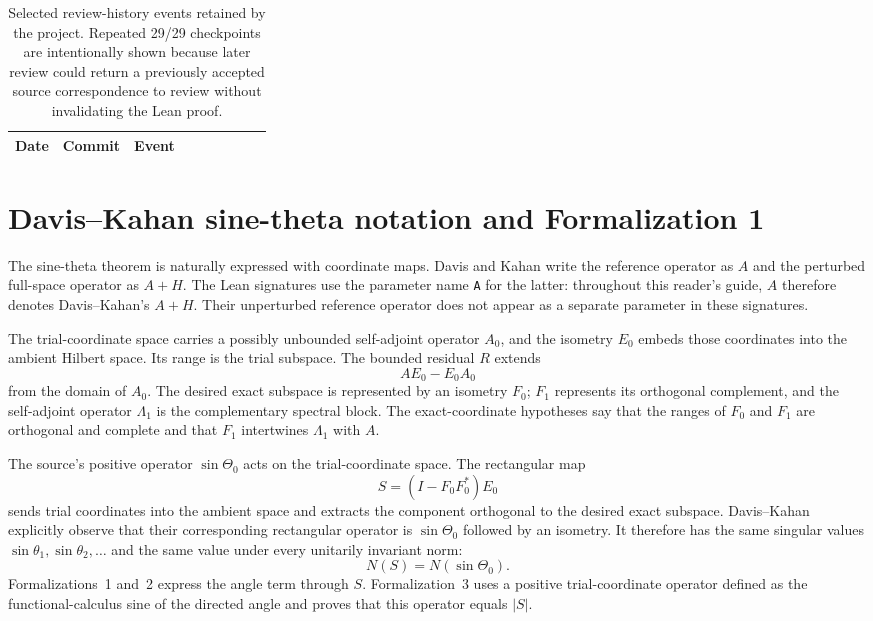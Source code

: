 \begin{table}[H]
\centering
\scriptsize
\caption{Selected review-history events retained by the project.  Repeated
29/29 checkpoints are intentionally shown because later review could return a
previously accepted source correspondence to review without invalidating the Lean proof.}
\label{tab:review-history}
\begin{tabularx}{\linewidth}{@{}p{0.16\linewidth}p{0.14\linewidth}>{\raggedright\arraybackslash}X@{}}
\toprule
Date & Commit & Event \\
\midrule

\end{tabularx}
\end{table}

\section{Davis--Kahan sine-theta notation and Formalization 1}
\label{app:formalization1}

The sine-theta theorem is naturally expressed with coordinate maps.  Davis and
Kahan write the reference operator as $A$ and the perturbed full-space operator
as $A+H$.  The Lean signatures use the parameter name \texttt{A} for the latter:
throughout this reader's guide, $A$ therefore denotes Davis--Kahan's $A+H$.
Their unperturbed reference operator does not appear as a separate parameter in
these signatures.

The trial-coordinate space carries a possibly unbounded self-adjoint operator
$A_0$, and the isometry $E_0$ embeds those coordinates into the ambient Hilbert
space.  Its range is the trial subspace.  The bounded residual $R$ extends
\[
  AE_0-E_0A_0
\]
from the domain of $A_0$.  The desired exact subspace is represented by an
isometry $F_0$; $F_1$ represents its orthogonal complement, and the
self-adjoint operator $\Lambda_1$ is the complementary spectral block.  The
exact-coordinate hypotheses say that the ranges of $F_0$ and $F_1$ are
orthogonal and complete and that $F_1$ intertwines $\Lambda_1$ with $A$.

The source's positive operator $\sin\Theta_0$ acts on the trial-coordinate
space.  The rectangular map
\[
  S=(I-F_0F_0^*)E_0
\]
sends trial coordinates into the ambient space and extracts the component
orthogonal to the desired exact subspace.  Davis--Kahan explicitly observe that
their corresponding rectangular operator is $\sin\Theta_0$ followed by an
isometry.  It therefore has the same singular values
$\sin\theta_1,\sin\theta_2,\ldots$ and the same value under every unitarily
invariant norm:
\[
  N(S)=N(\sin\Theta_0).
\]
Formalizations~1 and~2 express the angle term through $S$.  Formalization~3 uses
a positive trial-coordinate operator defined as the functional-calculus sine of
the directed angle and proves that this operator equals $|S|$.

